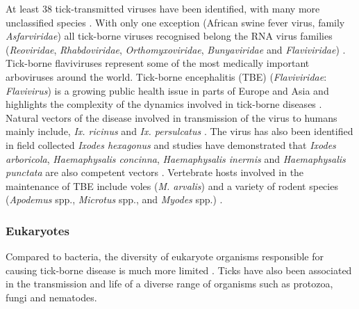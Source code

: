 \documentclass[a4paper, nobind]{templates/ociamthesis}
\begin{document}
At least 38 tick-transmitted viruses have been identified, with many more unclassified species \autocite{labudaTickborneViruses2004}. With only one exception (African swine fever virus, family \emph{Asfarviridae}) all tick-borne viruses recognised belong the RNA virus families (\emph{Reoviridae}, \emph{Rhabdoviridae}, \emph{Orthomyxoviridae}, \emph{Bunyaviridae} and \emph{Flaviviridae}) \autocite{labudaTickborneViruses2004}.
Tick-borne flaviviruses represent some of the most medically important arboviruses around the world.
Tick-borne encephalitis (TBE) (\emph{Flaviviridae}: \emph{Flavivirus}) is a growing public health issue in parts of Europe and Asia and highlights the complexity of the dynamics involved in tick-borne diseases \autocite{gritsunTickborneEncephalitis2003}.
Natural vectors of the disease involved in transmission of the virus to humans mainly include, \emph{Ix. ricinus} and \emph{Ix. persulcatus} \autocite{labudaTickborneViruses2004,sussTickborneEncephalitis20102011}.
The virus has also been identified in field collected \emph{Ixodes hexagonus} and studies have demonstrated that \emph{Ixodes arboricola}, \emph{Haemaphysalis concinna}, \emph{Haemaphysalis inermis} and \emph{Haemaphysalis punctata} are also competent vectors \autocite{gresikovaTickborneEncephalitis1998}.
Vertebrate hosts involved in the maintenance of TBE include voles (\emph{M. arvalis}) and a variety of rodent species (\emph{Apodemus} spp., \emph{Microtus} spp., and \emph{Myodes} spp.) \autocite{achaziRodentsSentinelsPrevalence2011}.

\hypertarget{eukaryotes}{%
\subsubsection{Eukaryotes}\label{eukaryotes}}

Compared to bacteria, the diversity of eukaryote organisms responsible for causing tick-borne disease is much more limited \autocite{tokarzDiscoverySurveillanceTickBorne2021}.
Ticks have also been associated in the transmission and life of a diverse range of organisms such as protozoa, fungi and nematodes.
\end{document}
